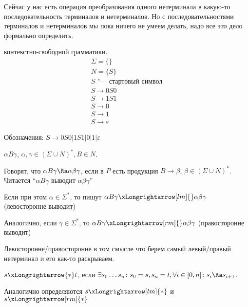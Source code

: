 Сейчас у нас есть операция преобразования одного нетерминала в какую-то последовательность терминалов и нетерминалов. 
Но с последовательностями терминалов и нетерминалов мы пока ничего не умеем делать, надо все это дело формально определить.

\begin{exmp}
        контекстно-свободной грамматики. 
	\begin{gather*}
	\Sigma = \{\}\\
	N = \{S\}\\
	S \text{ "--- стартовый символ}\\
	S \to 0S0\\
	S \to 1S1\\
	S \to 0\\
	S \to 1\\
	S \to \varepsilon
	\end{gather*}
\end{exmp}
\begin{Rem}
	Обозначения: $S \to 0S0|1S1|0|1|\varepsilon$\\
\end{Rem}

\begin{Def}        
    $\alpha B \gamma$, $\alpha, \gamma \in (\Sigma \cup N)^*, B \in N$.

    Говорят, что $\alpha B \gamma \Ra \alpha \beta \gamma$, если в $P$ есть продукция $B \to \beta$, $\beta \in (\Sigma \cup N)^*$. 
    Читается ``$\alpha B \gamma$ выводит $\alpha \beta \gamma$''
\end{Def}

\begin{Def}
    Если при этом $\alpha \in \Sigma^*$, то пишут
    $\alpha B \gamma \xLongrightarrow[lm]{} \alpha \beta \gamma$ (левосторонне выводит)

    Аналогично, если $\gamma \in \Sigma^*$, то
    $\alpha B \gamma \xLongrightarrow[rm]{} \alpha \beta \gamma$ (правосторонне выводит)
\end{Def}
\begin{Rem}
    Левосторонне/правосторонне в том смысле что берем самый левый/правый нетерминал и его как-то раскрываем.
\end{Rem}

\begin{Def}
$s \xLongrightarrow{*} t$, если $\exists s_0\dots s_n \colon s_0 = s, s_n = t, \forall i \in [0, n] \colon s_i \Ra s_{i+1}$.

Аналогично определяются $s \xLongrightarrow[lm]{*}$ и $s \xLongrightarrow[rm]{*}$
\end{Def}

